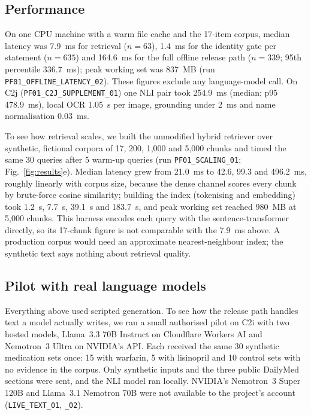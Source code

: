 \documentclass[conference]{IEEEtran}
\begin{document}
\subsection{Performance}

On one CPU machine with a warm file cache and the 17-item corpus, median latency was 7.9~ms for retrieval
($n=63$), 1.4~ms for the identity gate per statement ($n=635$) and 164.6~ms for the full offline release path
($n=339$; 95th percentile 336.7~ms); peak working set was 837~MB (run \texttt{PF01\_OFFLINE\_LATENCY\_02}). These
figures exclude any language-model call. On C2j (\texttt{PF01\_C2J\_SUPPLEMENT\_01}) one NLI pair took 254.9~ms
(median; p95 478.9~ms), local OCR 1.05~s per image, grounding under 2~ms and name normalisation 0.03~ms.

To see how retrieval scales, we built the unmodified hybrid retriever over synthetic, fictional corpora of 17, 200,
1{,}000 and 5{,}000 chunks and timed the same 30 queries after 5 warm-up queries (run \texttt{PF01\_SCALING\_01}; Fig.~\ref{fig:results}e). Median latency grew from 21.0~ms to 42.6, 99.3 and 496.2~ms, roughly linearly with corpus
size, because the dense channel scores every chunk by brute-force cosine similarity; building the index (tokenising and
embedding) took 1.2~s, 7.7~s, 39.1~s and 183.7~s, and peak working set reached 980~MB at 5{,}000 chunks. This harness
encodes each query with the sentence-transformer directly, so its 17-chunk figure is not comparable with the 7.9~ms
above. A production corpus would need an approximate nearest-neighbour index; the synthetic text says nothing about
retrieval quality.


\subsection{Pilot with real language models}
\label{sec:live}

Everything above used scripted generation. To see how the release path handles text a model actually writes, we ran a
small authorised pilot on C2i with two hosted models, Llama~3.3 70B Instruct on Cloudflare Workers AI and Nemotron~3
Ultra on NVIDIA's API. Each received the same 30 synthetic medication sets once: 15 with warfarin, 5 with lisinopril
and 10 control sets with no evidence in the corpus. Only synthetic inputs and the three public DailyMed sections were
sent, and the NLI model ran locally. NVIDIA's Nemotron~3 Super 120B and Llama~3.1 Nemotron 70B were not available to
the project's account (\texttt{LIVE\_TEXT\_01}, \texttt{\_02}).
\end{document}
